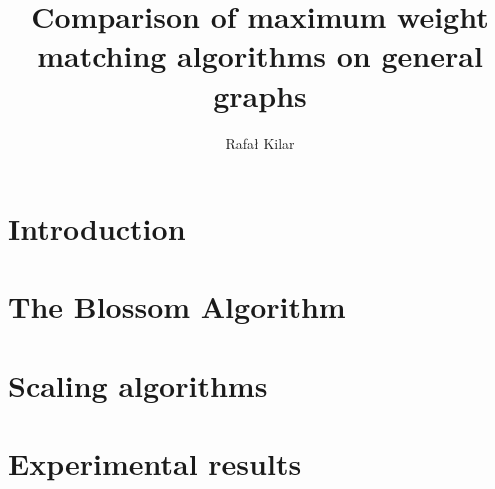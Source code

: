 \documentclass{report}
\title{Comparison of maximum weight matching algorithms on general graphs}
\author{Rafał Kilar}
\begin{document}

\pagebreak


\tableofcontents
\pagebreak

\chapter{Introduction}




\chapter{The Blossom Algorithm}\label{chap:blossom}


\chapter{Scaling algorithms}\label{chap:scaling}


\chapter{Experimental results}\label{chap:results}


\printbibliography

\end{document}
